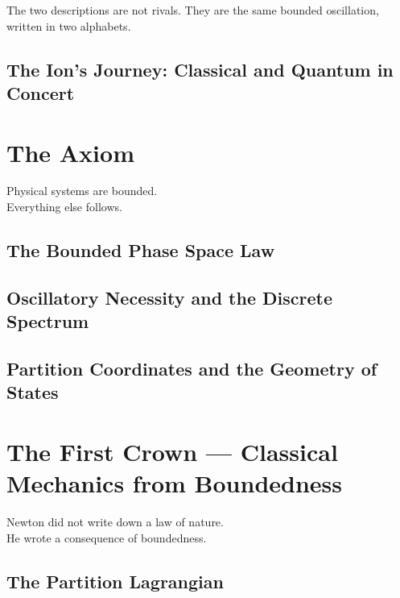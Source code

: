 \documentclass[12pt, twoside, openright]{book}
\theoremstyle{definition}
\theoremstyle{remark}
\begin{document}
\epigraph{%
  The two descriptions are not rivals.
  They are the same bounded oscillation,
  written in two alphabets.%
}{}

\chapter{The Ion's Journey: Classical and Quantum in Concert}
\label{ch:ion-journey}


\part{The Axiom}
\label{part:axiom}

\epigraph{%
  Physical systems are bounded.\\
  Everything else follows.%
}{}

\chapter{The Bounded Phase Space Law}
\label{ch:axiom}


\chapter{Oscillatory Necessity and the Discrete Spectrum}
\label{ch:oscillation}


\chapter{Partition Coordinates and the Geometry of States}
\label{ch:coordinates}


\part{The First Crown --- Classical Mechanics from Boundedness}
\label{part:classical}

\epigraph{%
  Newton did not write down a law of nature.\\
  He wrote a consequence of boundedness.%
}{}

\chapter{The Partition Lagrangian}
\label{ch:lagrangian}

\end{document}
